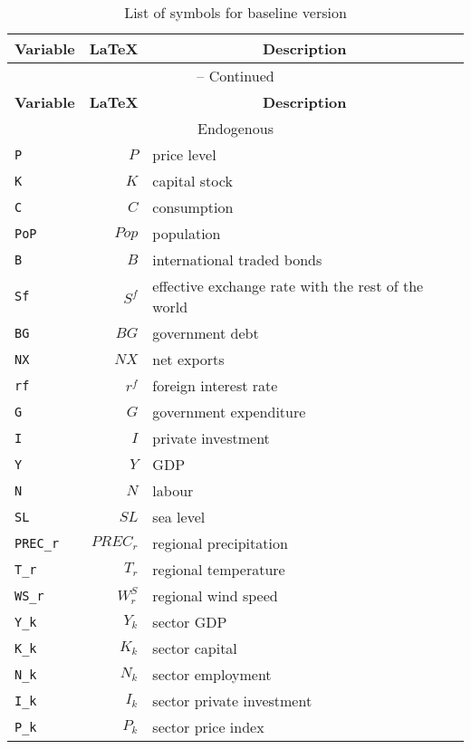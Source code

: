 \begin{center}
\begin{longtable}{lrl}
\caption{List of symbols for baseline version}\label{tab:listofsymbols}\\%
\hline
\multicolumn{1}{c}{\textbf{Variable}} &
\multicolumn{1}{c}{\textbf{\LaTeX}} &
\multicolumn{1}{c}{\textbf{Description}}\\%
\hline\hline%
\endfirsthead
\multicolumn{3}{c}{{\tablename} \thetable{} -- Continued}\\%
\hline%
\multicolumn{1}{c}{\textbf{Variable}} &
\multicolumn{1}{c}{\textbf{\LaTeX}} &
\multicolumn{1}{c}{\textbf{Description}}\\%
\hline\hline%
\endhead
\hline
\multicolumn{3}{c}{Endogenous}\\%
\hline%
\texttt{P} & $P$ & price level\\
\texttt{K} & $K$ & capital stock\\
\texttt{C} & $C$ & consumption\\
\texttt{PoP} & $Pop$ & population\\
\texttt{B} & $B$ & international traded bonds\\
\texttt{Sf} & $S^{f}$ & effective exchange rate with the rest of the world\\
\texttt{BG} & $BG$ & government debt\\
\texttt{NX} & $NX$ & net exports\\
\texttt{rf} & ${r^{f}}$ & foreign interest rate\\
\texttt{G} & $G$ & government expenditure\\
\texttt{I} & $I$ & private investment\\
\texttt{Y} & $Y$ & GDP\\
\texttt{N} & $N$ & labour\\
\texttt{SL} & ${SL}$ & sea level\\
\texttt{PREC\_r} & ${PREC_{r}}$ & regional precipitation\\
\texttt{T\_r} & ${T_{r}}$ & regional temperature\\
\texttt{WS\_r} & ${W_{r}^{S}}$ & regional wind speed\\
\texttt{Y\_k} & ${Y_k}$ & sector GDP\\
\texttt{K\_k} & ${K_k}$ & sector capital\\
\texttt{N\_k} & ${N_k}$ & sector employment\\
\texttt{I\_k} & ${I_k}$ & sector private investment\\
\texttt{P\_k} & ${P_k}$ & sector price index\\

\end{longtable}
\end{center}
